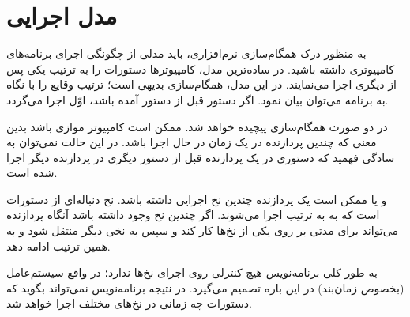 \documentclass{book}
\begin{document}
\section {مدل اجرایی}


    به منظور درک همگام‌سازی نرم‌افزاری، باید مدلی از چگونگی اجرای برنامه‌های کامپیوتری داشته باشید.
    در ساده‌ترین مدل، کامپیوترها دستورات را به ترتیب یکی پس از دیگری اجرا می‌نمایند. 
    در این مدل، همگام‌سازی بدیهی است؛‌ ترتیب وقایع را با نگاه به  برنامه می‌توان بیان نمود. 
    اگر دستور  قبل از دستور  آمده باشد، اوّل اجرا می‌گردد. 

    در دو صورت همگام‌سازی پیچیده خواهد شد. 
    ممکن است کامپیوتر موازی باشد بدین معنی که چندین پردازنده در یک زمان در حال اجرا باشد. در این حالت نمی‌توان به سادگی فهمید که 
    دستوری در یک پردازنده قبل از دستور دیگری در پردازنده دیگر اجرا شده است. 

    و یا ممکن است یک پردازنده چندین نخ اجرایی داشته باشد. نخ دنباله‌ای از دستورات است که به به ترتیب اجرا می‌شوند. 
    اگر چندین نخ وجود داشته باشد آنگاه پردازنده می‌تواند برای مدتی بر روی یکی  از نخ‌ها کار کند و سپس به نخی دیگر منتقل شود و به همین 
    ترتیب ادامه دهد. 

    به طور کلی برنامه‌نویس هیچ کنترلی روی اجرای نخ‌ها ندارد؛ در واقع سیستم‌عامل (بخصوص زمان‌بند) در این باره تصمیم‌ می‌گیرد. 
    در نتیجه برنامه‌نویس نمی‌تواند بگوید که دستورات چه زمانی در نخ‌های مختلف اجرا خواهد شد.
    
\end{document}
